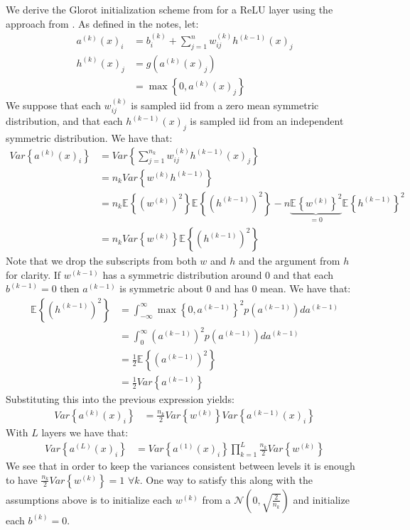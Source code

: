 \documentclass[paper=a4, fontsize=11pt]{scrartcl} %
\numberwithin{equation}{section} %
\numberwithin{figure}{section} %
\numberwithin{table}{section} %
\newcommand{\Ex}[2]{\mathbb{E}_{#1}\left\{#2\right\}}
\begin{document}
We derive the Glorot initialization scheme from \cite{pmlr-v9-glorot10a} for a ReLU layer using the approach from \cite{He:2015:DDR:2919332.2919814} . As defined in the notes, let:
\begin{align*}
a^{(k)}(x)_i &= b_i^{(k)} + \sum_{j=1}^n w_{ij}^{(k)}h^{(k-1)}(x)_j \\
h^{(k)}(x)_j &= g(a^{(k)}(x)_j)\\
&= \max\left\{ 0, a^{(k)}(x)_j \right\}
\end{align*}
We suppose that each $w_{ij}^{(k)}$ is sampled iid from a zero mean symmetric distribution, and that each $h^{(k-1)}(x)_j$ is sampled iid from an independent symmetric distribution. We have that:
\begin{align*}
Var\left\{a^{(k)}(x)_i\right\}&= Var\left\{\sum_{j=1}^{n_k} w_{ij}^{(k)}h^{(k-1)}(x)_j\right\}\\
&= n_k Var\left\{w^{(k)}h^{(k-1)}\right\}\\
&= n_k \Ex{}{(w^{(k)})^2}\Ex{}{(h^{(k-1)})^2} - n \underbrace{\Ex{}{w^{(k)}}^2}_{=0}\Ex{}{h^{(k-1)}}^2\\
&= n_k Var\left\{w^{(k)}\right\}\Ex{}{(h^{(k-1)})^2}
\end{align*}
Note that we drop the subscripts from both $w$ and $h$ and the argument from $h$ for clarity. If $w^{(k-1)}$ has a symmetric distribution around 0 and that each $b^{(k-1)}=0$ then $a^{(k-1)}$ is symmetric about 0 and has 0 mean. We have that:
\begin{align*}
\Ex{}{(h^{(k-1)})^2} &= \int_{-\infty}^{\infty} \max\left\{ 0, a^{(k-1)} \right\}^2 p(a^{(k-1)})da^{(k-1)}\\
&= \int_{0}^{\infty} (a^{(k-1)})^2p(a^{(k-1)})da^{(k-1)}\\
&=\frac{1}{2}\Ex{}{(a^{(k-1)})^2}\\
&= \frac{1}{2} Var\left\{ a^{(k-1)}\right\}
\end{align*}
Substituting this into the previous expression yields:
\begin{align*}
Var\left\{a^{(k)}(x)_i\right\} &= \frac{n_k}{2} Var\left\{w^{(k)}\right\}Var\left\{ a^{(k-1)}(x)_i\right\}
\end{align*}
With $L$ layers we have that:
\begin{align*}
Var\left\{a^{(L)}(x)_i\right\} &= Var\left\{ a^{(1)}(x)_i\right\} \prod_{k=1}^{L} \frac{n_k}{2} Var\left\{w^{(k)}\right\}
\end{align*}
We see that in order to keep the variances consistent between levels it is enough to have $\frac{n_k}{2} Var\left\{w^{(k)}\right\} = 1$ $\forall k$. One way to satisfy this along with the assumptions above is to initialize each $w^{(k)}$ from a $\mathcal{N}\left(0, \sqrt{\frac{2}{n_k}}\right)$ and initialize each $b^{(k)}=0$.
\end{document}
